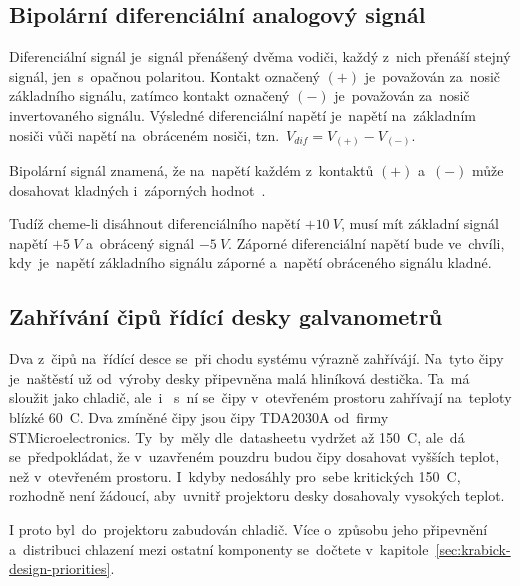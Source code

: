 \subsection{Bipolární diferenciální analogový signál}
Diferenciální signál je~signál přenášený dvěma vodiči, každý z~nich přenáší stejný signál,  jen~s~opačnou polaritou. Kontakt označený $(+)$ je~považován za~nosič základního signálu, zatímco kontakt označený $(-)$ je~považován za~nosič invertovaného signálu. Výsledné diferenciální napětí je~napětí na~základním nosiči vůči napětí na~obráceném nosiči, tzn.~$V_{dif} = V_{(+)} - V_{(-)}$.~\cite{ilda-signal-spec}

Bipolární signál znamená, že na~napětí každém z~kontaktů $(+)$ a~$(-)$ může dosahovat kladných i~záporných hodnot~\cite{ilda-signal-spec}.

Tudíž cheme-li disáhnout diferenciálního napětí $+10~V$, musí mít základní signál napětí $+5~V$ a~obrácený signál $-5~V$. Záporné diferenciální napětí bude ve~chvíli,  kdy~je~napětí základního signálu záporné a~napětí obráceného signálu kladné.

\subsection{Zahřívání čipů řídící desky galvanometrů} \label{sec:galvoboard-chips-heating-up}
Dva z~čipů na~řídící desce se~při chodu systému výrazně zahřívájí. Na~tyto čipy je~naštěstí už od~výroby desky připevněna malá hliníková destička. Ta~má sloužit jako chladič,  ale~i ~s~ní se~čipy v~otevřeném prostoru zahřívají na~teploty blízké 60~\degree{}C.
Dva zmíněné čipy jsou čipy TDA2030A od~firmy STMicroelectronics. Ty~by~měly  dle~datasheetu vydržet až 150~\degree{}C,  ale~dá se~předpokládat, že v~uzavřeném pouzdru budou čipy dosahovat vyšších teplot, než v~otevřeném prostoru. I~kdyby nedosáhly  pro~sebe kritických 150~\degree{}C, rozhodně není žádoucí,  aby~uvnitř projektoru desky dosahovaly vysokých teplot.

I proto  byl~do~projektoru zabudován chladič. Více o~způsobu jeho připevnění a~distribuci chlazení mezi ostatní komponenty se~dočtete v~kapitole~\ref{sec:krabick-design-priorities}.
